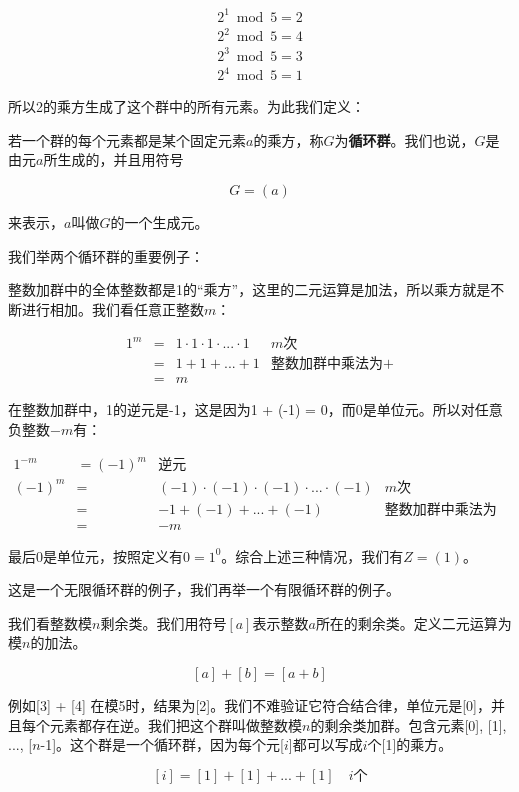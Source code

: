 \documentclass[b5paper]{ctexart}
\begin{document}
\[
\begin{array}{l}
2^1 \bmod 5 = 2 \\
2^2 \bmod 5 = 4 \\
2^3 \bmod 5 = 3 \\
2^4 \bmod 5 = 1
\end{array}
\]

所以2的乘方生成了这个群中的所有元素。为此我们定义：

\begin{definition}
若一个群的每个元素都是某个固定元素$a$的乘方，称$G$为\textbf{循环群}。我们也说，$G$是由元$a$所生成的，并且用符号

\[
G = (a)
\]

来表示，$a$叫做$G$的一个生成元。
\end{definition}

我们举两个循环群的重要例子：

\begin{example}
整数加群中的全体整数都是1的“乘方”，这里的二元运算是加法，所以乘方就是不断进行相加。我们看任意正整数$m$：

\[
\begin{array}{rcll}
1^m & = & 1 \cdot 1 \cdot 1 \cdot ... \cdot 1 & \text{$m$次} \\
    & = & 1 + 1 + ... + 1 & \text{整数加群中乘法为+} \\
    & = & m &
\end{array}
\]

在整数加群中，1的逆元是-1，这是因为1 + (-1) = 0，而0是单位元。所以对任意负整数$-m$有：

\[
\begin{array}{rcll}
1^{-m} & = (-1)^m & \text{逆元} & \\
(-1)^m & = & (-1) \cdot (-1) \cdot (-1) \cdot ... \cdot (-1) & \text{$m$次} \\
       & = & -1 + (-1) + ... + (-1) & \text{整数加群中乘法为+} \\
       & = & -m &
\end{array}
\]

最后0是单位元，按照定义有$0 = 1^0$。综合上述三种情况，我们有$Z = (1)$。
\end{example}

这是一个无限循环群的例子，我们再举一个有限循环群的例子。

\begin{example}
我们看整数模$n$剩余类。我们用符号$[a]$表示整数$a$所在的剩余类。定义二元运算为模$n$的加法。

\[
[a] + [b] = [a + b]
\]

例如[3] + [4] 在模5时，结果为[2]。我们不难验证它符合结合律，单位元是[0]，并且每个元素都存在逆。我们把这个群叫做整数模$n$的剩余类加群。包含元素[0], [1], ..., [$n$-1]。这个群是一个循环群，因为每个元[$i$]都可以写成$i$个[1]的乘方。

\[
[i] = [1] + [1] + ... + [1] \quad \text{$i$个}
\]
\end{example}
\end{document}
